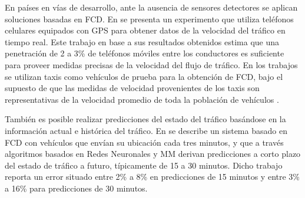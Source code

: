 En países en vías de desarrollo, ante la ausencia de sensores detectores se aplican soluciones basadas en FCD. En \cite{herrera2010evaluation} se presenta un experimento que utiliza teléfonos celulares equipados con GPS para obtener datos de la velocidad del tráfico en tiempo real. Este trabajo en base a sus  resultados obtenidos estima que una penetración de 2 a 3\% de teléfonos móviles entre los conductores es suficiente para proveer medidas precisas de la velocidad del flujo de tráfico. En los trabajos  \cite{reinthaler2007evaluation, sevlian2010travel,li2007practical} se utilizan taxis como vehículos de prueba para la obtención de FCD, bajo el supuesto de que las medidas de velocidad provenientes de los taxis son representativas de la velocidad promedio de toda la población de vehículos \cite{linauer2004fleet}. 

También es posible realizar predicciones del estado del tráfico basándose en la información actual e histórica del tráfico. En \cite{de2008traffic} se describe un sistema basado en FCD con vehículos que envían su ubicación cada tres minutos, y que a través algoritmos basados en Redes Neuronales y MM derivan predicciones a corto plazo del estado de tráfico a futuro, típicamente de 15 a 30 minutos. Dicho trabajo reporta un error situado entre 2\% a 8\% en predicciones de 15 minutos y entre 3\% a 16\% para predicciones de 30 minutos.